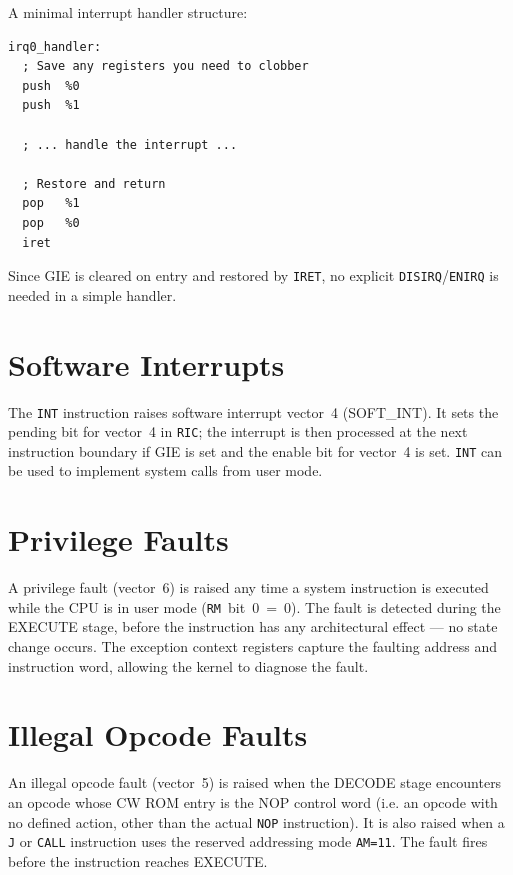 \documentclass[a4paper,12pt]{report}
\newcommand{\asm}[1]{\texttt{#1}}
\begin{document}
A minimal interrupt handler structure:

\begin{lstlisting}
irq0_handler:
  ; Save any registers you need to clobber
  push  %0
  push  %1

  ; ... handle the interrupt ...

  ; Restore and return
  pop   %1
  pop   %0
  iret
\end{lstlisting}

Since GIE is cleared on entry and restored by \asm{IRET}, no explicit \asm{DISIRQ}/\asm{ENIRQ} is needed in a simple handler.

\section{Software Interrupts}

The \asm{INT} instruction raises software interrupt vector~4 (SOFT\_INT). It sets the pending bit for vector~4 in \asm{RIC}; the interrupt is then processed at the next instruction boundary if GIE is set and the enable bit for vector~4 is set. \asm{INT} can be used to implement system calls from user mode.

\section{Privilege Faults}

A privilege fault (vector~6) is raised any time a system instruction is executed while the CPU is in user mode (\asm{RM}~bit~0~=~0). The fault is detected during the EXECUTE stage, before the instruction has any architectural effect --- no state change occurs. The exception context registers capture the faulting address and instruction word, allowing the kernel to diagnose the fault.

\section{Illegal Opcode Faults}

An illegal opcode fault (vector~5) is raised when the DECODE stage encounters an opcode whose CW ROM entry is the NOP control word (i.e. an opcode with no defined action, other than the actual \asm{NOP} instruction). It is also raised when a \asm{J} or \asm{CALL} instruction uses the reserved addressing mode \texttt{AM=11}. The fault fires before the instruction reaches EXECUTE.

\end{document}
